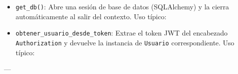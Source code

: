 \documentclass[a4paper,11pt,spanish]{sphinxmanual}
\newcommand{\robotoMonoBold}{\fontseries{b}\selectfont\ttfamily}
\renewcommand{\sphinxcode}[1]{\textcolor{sphinxorangeCode}{{\robotoMonoBold #1}}}
\renewcommand{\sphinxupquote}[1]{\texttt{#1}}
\begin{document}
\begin{itemize}
\item {} 
\sphinxAtStartPar
\sphinxcode{\sphinxupquote{get\_db()}}:
\sphinxhyphen{} Abre una sesión de base de datos (SQLAlchemy) y la cierra automáticamente al salir del contexto.
\sphinxhyphen{} Uso típico:
\begin{quote}

\begin{sphinxVerbatim}[commandchars=\\\{\}]
   
\end{sphinxVerbatim}
\end{quote}

\item {} 
\sphinxAtStartPar
\sphinxcode{\sphinxupquote{obtener\_usuario\_desde\_token}}:
\sphinxhyphen{} Extrae el token JWT del encabezado \sphinxcode{\sphinxupquote{Authorization}} y devuelve la instancia de \sphinxcode{\sphinxupquote{Usuario}} correspondiente.
\sphinxhyphen{} Uso típico:
\begin{quote}

\begin{sphinxVerbatim}[commandchars=\\\{\}]
   
\end{sphinxVerbatim}
\end{quote}

\end{itemize}

\sphinxAtStartPar
—
\end{document}
